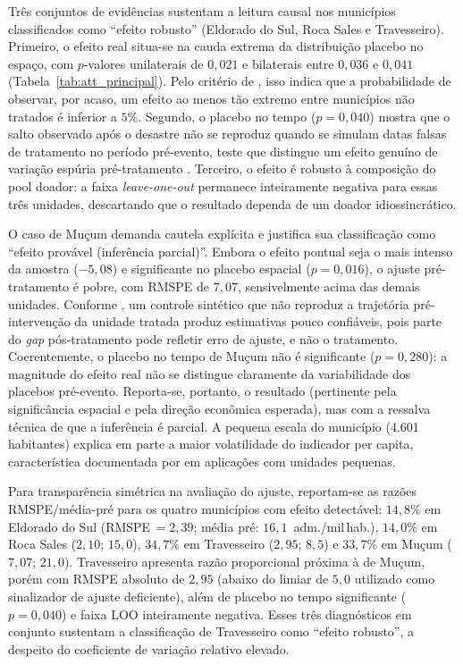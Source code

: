 \documentclass[a4paper,12pt]{article}
\begin{document}
Três conjuntos de evidências sustentam a leitura causal nos municípios
classificados como ``efeito robusto'' (Eldorado do Sul, Roca Sales e
Travesseiro). Primeiro, o efeito real situa-se na cauda extrema da
distribuição placebo no espaço, com $p$-valores unilaterais de $0{,}021$ e
bilaterais entre $0{,}036$ e $0{,}041$ (Tabela~\ref{tab:att_principal}). Pelo
critério de , isso indica que a probabilidade de
observar, por acaso, um efeito ao menos tão extremo entre municípios não
tratados é inferior a $5\%$. Segundo, o placebo no tempo ($p = 0{,}040$) mostra
que o salto observado após o desastre não se reproduz quando se simulam datas
falsas de tratamento no período pré-evento, teste que distingue um efeito
genuíno de variação espúria pré-tratamento \cite{abadie2015}. Terceiro, o
efeito é robusto à composição do pool doador: a faixa \textit{leave-one-out}
permanece inteiramente negativa para essas três unidades, descartando que o
resultado dependa de um doador idiossincrático.

O caso de Mu\c{c}um demanda cautela explícita e justifica sua classificação
como ``efeito provável (inferência parcial)''. Embora o efeito pontual seja o
mais intenso da amostra ($-5{,}08$) e significante no placebo espacial
($p = 0{,}016$), o ajuste pré-tratamento é pobre, com RMSPE de $7{,}07$,
sensivelmente acima das demais unidades. Conforme , um
controle sintético que não reproduz a trajetória pré-intervenção da unidade
tratada produz estimativas pouco confiáveis, pois parte do \textit{gap}
pós-tratamento pode refletir erro de ajuste, e não o tratamento. Coerentemente,
o placebo no tempo de Mu\c{c}um não é significante ($p = 0{,}280$): a
magnitude do efeito real não se distingue claramente da variabilidade dos
placebos pré-evento. Reporta-se, portanto, o resultado (pertinente pela
significância espacial e pela direção econômica esperada), mas com a
ressalva técnica de que a inferência é parcial. A pequena escala do município
(4{.}601 habitantes) explica em parte a maior volatilidade do indicador per
capita, característica documentada por  em aplicações
com unidades pequenas.

Para transparência simétrica na avaliação do ajuste, reportam-se as razões
RMSPE/média-pré para os quatro municípios com efeito detectável: $14{,}8\%$ em
Eldorado do Sul (RMSPE\,$=2{,}39$; média pré: $16{,}1$~adm./mil\,hab.), $14{,}0\%$
em Roca Sales ($2{,}10$; $15{,}0$), $34{,}7\%$ em Travesseiro ($2{,}95$;
$8{,}5$) e $33{,}7\%$ em Muçum ($7{,}07$; $21{,}0$). Travesseiro apresenta
razão proporcional próxima à de Muçum, porém com RMSPE absoluto de $2{,}95$
(abaixo do limiar de $5{,}0$ utilizado como sinalizador de ajuste deficiente),
além de placebo no tempo significante ($p=0{,}040$) e faixa LOO inteiramente
negativa. Esses três diagnósticos em conjunto sustentam a classificação de
Travesseiro como ``efeito robusto'', a despeito do coeficiente de variação
relativo elevado.
\end{document}
